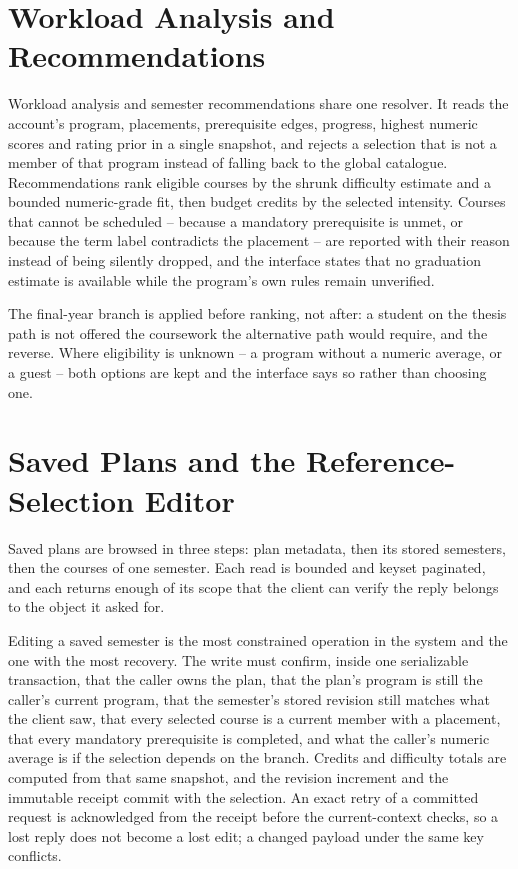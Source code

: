 \section{Workload Analysis and Recommendations}

Workload analysis and semester recommendations share one resolver. It reads the account's program,
placements, prerequisite edges, progress, highest numeric scores and rating prior in a single
snapshot, and rejects a selection that is not a member of that program instead of falling back to
the global catalogue. Recommendations rank eligible courses by the shrunk difficulty estimate and a
bounded numeric-grade fit, then budget credits by the selected intensity. Courses that cannot be
scheduled -- because a mandatory prerequisite is unmet, or because the term label contradicts the
placement -- are reported with their reason instead of being silently dropped, and the interface
states that no graduation estimate is available while the program's own rules remain unverified.

The final-year branch is applied before ranking, not after: a student on the thesis path is not
offered the coursework the alternative path would require, and the reverse. Where eligibility is
unknown -- a program without a numeric average, or a guest -- both options are kept and the
interface says so rather than choosing one.

\section{Saved Plans and the Reference-Selection Editor}

Saved plans are browsed in three steps: plan metadata, then its stored semesters, then the courses
of one semester. Each read is bounded and keyset paginated, and each returns enough of its scope
that the client can verify the reply belongs to the object it asked for.

Editing a saved semester is the most constrained operation in the system and the one with the most
recovery. The write must confirm, inside one serializable transaction, that the caller owns the
plan, that the plan's program is still the caller's current program, that the semester's stored
revision still matches what the client saw, that every selected course is a current member with a
placement, that every mandatory prerequisite is completed, and what the caller's numeric average is
if the selection depends on the branch. Credits and difficulty totals are computed from that same
snapshot, and the revision increment and the immutable receipt commit with the selection. An exact
retry of a committed request is acknowledged from the receipt before the current-context checks, so
a lost reply does not become a lost edit; a changed payload under the same key conflicts.

